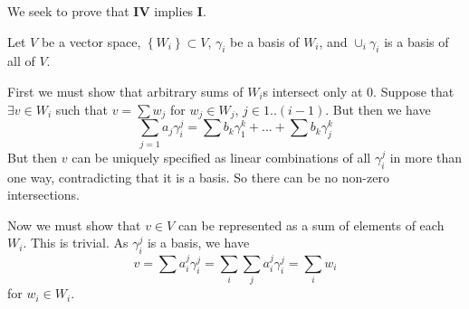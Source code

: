 \documentclass[boxes,sansserif]{rutgers_hw}
\author{Ravi D'Elia}
\date{2023-04-06} %
\begin{document}
\maketitle
\setlength\parindent{0pt}

We seek to prove that \textbf{IV} implies \textbf{I}.

Let $V$ be a vector space, $\left\{ W_i \right\} \subset V$, $\gamma_i$ be a basis of $W_i$,
and $\cup_i \gamma_i$ is a basis of all of $V$.

First we must show that arbitrary sums of $W_i$s intersect only at $0$. Suppose that
$\exists v \in W_i$ such that $v = \sum w_j$ for $w_j \in W_j$, $j \in 1..(i-1)$. But then
we have
\begin{displaymath}
  \sum_{j = 1} a_j \gamma_i^j = \sum b_k \gamma_1^k + ... + \sum b_k \gamma_j^k
\end{displaymath}
But then $v$ can be uniquely specified as linear combinations of all $\gamma_i^j$ in more
than one way, contradicting that it is a basis. So there can be no non-zero intersections.

Now we must show that $v \in V$ can be represented as a sum of elements of each $W_i$. This
is trivial. As $\gamma_i^j$ is a basis, we have
\begin{displaymath}
  v = \sum a_i^j \gamma_i^j = \sum_i \sum_j a_i^j \gamma_i^j = \sum_i w_i
\end{displaymath}
for $w_i \in W_i$. 
\end{document}

